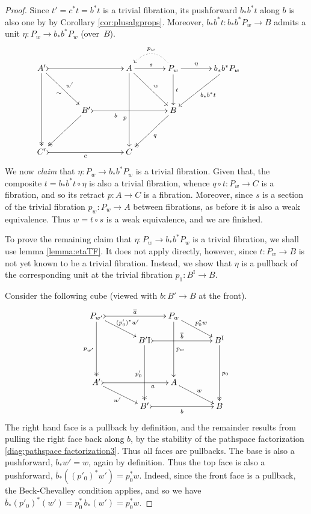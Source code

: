 \documentclass[11pt]{amsart}
\newcommand{\ra}{\ensuremath{\rightarrow}}
\newcommand{\I}{\ensuremath{\mathrm{I}}}
\theoremstyle{remark}
\theoremstyle{definition}
\begin{document}
\begin{proof}
Since $t' = c^*t = b^*t$ is a trivial fibration, its pushforward $b_*b^*t$ along $b$ is also one by by Corollary \ref{cor:plusalgprops}.  Moreover, $b_*b^*t : b_*b^*P_w \ra B$ admits a unit $\eta : P_w \ra  b_*b^*P_w$ (over~$B$).  
\begin{equation}\label{diag:EEPfactored3}
\xymatrix@=1.5em{
A' \ar@{->>}[dddd] \ar[rrdd]_{\sim}^{w'} \ar@{>->}[rrrr] && && A \ar[dddd]_>>>>>>>>>>>>p \ar[rrdd]^{w} \ar[rr]^s && \ar@{.>}@/_1.5pc/[ll]_{p_w} P_w \ar[dd]^t \ar[rr]^-\eta && b_*b^*P_w \ar[lldd]^{b_*b^*t}\\
\\
&& B' \ar@{->>}[lldd] \ar@{>->}[rrrr]_<<<<<<<<<<b  &&&& B \ar@{->>}[lldd]^q &&&& \\
\\
C' \ar@{>->}[rrrr]_c &&&& C &&&&
}
\end{equation}
We now \emph{claim} that $\eta : P_w \ra  b_*b^*P_w$ is a trivial fibration.  Given that,  the composite $t = b_*b^*t \circ \eta$ is also a trivial fibration, whence $q\circ t : P_w \ra C$ is a fibration, and so its retract $p:A\ra C$ is a fibration.  Moreover, since $s$ is a section of the trivial fibration $p_w: P_w\ra A$ between fibrations, as before it is also a weak equivalence. Thus $w=t\circ s$ is a weak equivalence, and we are finished. 

To prove the remaining claim that $\eta : P_w \ra  b_*b^*P_w$ is a trivial fibration, we shall use lemma \ref{lemma:etaTF}.  It does not apply directly, however, since $t : P_w \ra B$ is not yet known to be a trivial fibration.  Instead, we show that $\eta$ is a pullback of the corresponding unit at the trivial fibration $p_1 : B^\I \ra B$.

Consider the following cube (viewed with $b:B'\ra B$ at the front).
\begin{equation}\label{diag:ppcube}
\xymatrix@=1.5em{
P_{w'} \ar@{->>}[ddd]_{p_{w'}} \ar[rrd]^{(p'_0)^*w'} \ar@{>->}[rrr]^{\overline{a}}
		&&& P_w \ar[ddd]^{p_w} \ar[rrd]^{p_0^*w} &&\\
&& B'^\I \ar@{->>}[ddd]_{p'_0} \ar@{>->}[rrr]^{\overline{b}}  
		&&& B^\I \ar@{->>}[ddd]^{p_0} \\
\\
A' \ar@{>->}[rrr]_>>>>>>>a  \ar[rrd]_{w'}
		&&& A \ar[rrd]^{w} &&\\
&& B'\ar@{>->}[rrr]_b &&& B
}
\end{equation}
The right hand face is a pullback by definition, and the remainder results from pulling the right face back along $b$, by the stability of the pathspace factorization \eqref{diag:pathspace factorization3}. Thus all faces are pullbacks.  The base is also a pushforward, $b_*w'=w$, again by definition.  Thus the top face is also a pushforward, $\overline{b}_*((p'_0)^*w')=p_0^*w$. Indeed, since the front face is a pullback, the Beck-Chevalley condition applies, and so we have $\overline{b}_*(p'_0)^*(w') = p_0^*\,b_*(w') = p_0^*w$.


\end{proof}
\end{document}
